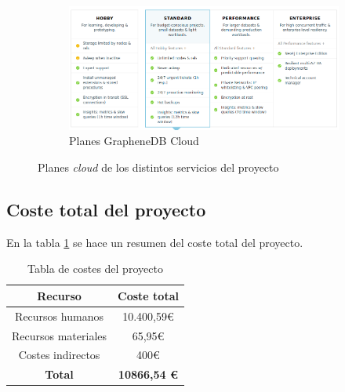 \begin{figure}[hbtp]
\begin{subfigure}{.6\textwidth}
    \includegraphics[width=\linewidth]{figuras/graphenedb-plan.png}
    \caption{Planes GrapheneDB Cloud} 
    \label{fig::PlanesGrapheneDBCloud}
\end{subfigure}
\caption{Planes \textit{cloud} de los distintos servicios del proyecto}
\label{fig::costes}
\end{figure}

\subsection{Coste total del proyecto}

En la tabla \ref{tab:: tablaCostes} se hace un resumen del coste total del proyecto.
	\begin{table}[htbp]
	\centering
	\begin{tabular}{|c|c|}
	\hline
	\textbf{Recurso}        & \textbf{Coste total } 	\\\hline
	Recursos   humanos  	& 10.400,59\euro             \\
	Recursos   materiales 	& 65,95\euro           		\\
	Costes   indirectos     & 400\euro      			    \\\hline 
	\textbf{Total}          & \textbf{	10866,54 \euro} \\     
	\hline
	\end{tabular}
	\caption{Tabla de costes del proyecto}
	\label{tab:: tablaCostes}
	\end{table}